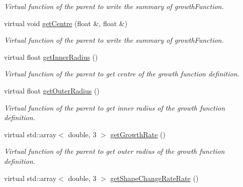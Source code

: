 \begin{DoxyCompactItemize}
\begin{DoxyCompactList}\small\item\em Virtual function of the parent to write the summary of growth\+Function. \end{DoxyCompactList}\item 
\hypertarget{classGrowthFunctionBase_a93aef4238b9da5d0b06cf18c552d3ca3}{}virtual void \hyperlink{classGrowthFunctionBase_a93aef4238b9da5d0b06cf18c552d3ca3}{get\+Centre} (float \&, float \&)\label{classGrowthFunctionBase_a93aef4238b9da5d0b06cf18c552d3ca3}

\begin{DoxyCompactList}\small\item\em Virtual function of the parent to write the summary of growth\+Function. \end{DoxyCompactList}\item 
\hypertarget{classGrowthFunctionBase_a05ace7e6cb21566ad03e72e56962d58b}{}virtual float \hyperlink{classGrowthFunctionBase_a05ace7e6cb21566ad03e72e56962d58b}{get\+Inner\+Radius} ()\label{classGrowthFunctionBase_a05ace7e6cb21566ad03e72e56962d58b}

\begin{DoxyCompactList}\small\item\em Virtual function of the parent to get centre of the growth function definition. \end{DoxyCompactList}\item 
\hypertarget{classGrowthFunctionBase_a2ba8f7659e1c0546998671458943233d}{}virtual float \hyperlink{classGrowthFunctionBase_a2ba8f7659e1c0546998671458943233d}{get\+Outer\+Radius} ()\label{classGrowthFunctionBase_a2ba8f7659e1c0546998671458943233d}

\begin{DoxyCompactList}\small\item\em Virtual function of the parent to get inner radius of the growth function definition. \end{DoxyCompactList}\item 
\hypertarget{classGrowthFunctionBase_a6a239fcefd398413d29a23dc8e7a075b}{}virtual std\+::array$<$ double, 3 $>$ \hyperlink{classGrowthFunctionBase_a6a239fcefd398413d29a23dc8e7a075b}{get\+Growth\+Rate} ()\label{classGrowthFunctionBase_a6a239fcefd398413d29a23dc8e7a075b}

\begin{DoxyCompactList}\small\item\em Virtual function of the parent to get outer radius of the growth function definition. \end{DoxyCompactList}\item 
\hypertarget{classGrowthFunctionBase_a79fbb3a43d05b82aa10b35c86bbef5f3}{}virtual std\+::array$<$ double, 3 $>$ \hyperlink{classGrowthFunctionBase_a79fbb3a43d05b82aa10b35c86bbef5f3}{get\+Shape\+Change\+Rate\+Rate} ()\label{classGrowthFunctionBase_a79fbb3a43d05b82aa10b35c86bbef5f3}


\end{DoxyCompactItemize}
